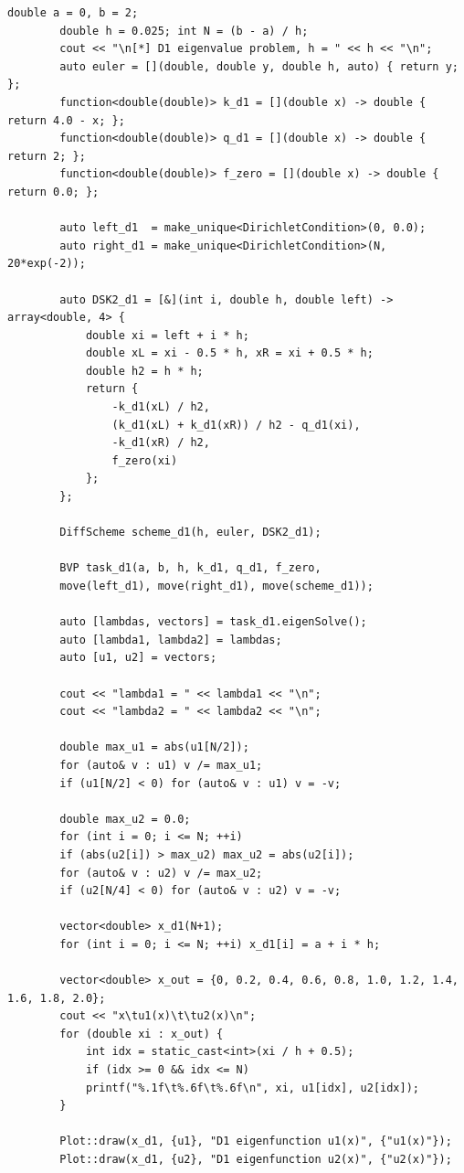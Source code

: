 \documentclass[a4paper,12pt]{article}
\begin{document}
	\begin{lstlisting}[caption={Численное решение исходной задачи}, label={lst:main}]
		double a = 0, b = 2;
		double h = 0.025; int N = (b - a) / h;
		cout << "\n[*] D1 eigenvalue problem, h = " << h << "\n";
		auto euler = [](double, double y, double h, auto) { return y; }; 
		function<double(double)> k_d1 = [](double x) -> double { return 4.0 - x; };
		function<double(double)> q_d1 = [](double x) -> double { return 2; };
		function<double(double)> f_zero = [](double x) -> double { return 0.0; };
		
		auto left_d1  = make_unique<DirichletCondition>(0, 0.0);
		auto right_d1 = make_unique<DirichletCondition>(N, 20*exp(-2));
		
		auto DSK2_d1 = [&](int i, double h, double left) -> array<double, 4> {
			double xi = left + i * h;
			double xL = xi - 0.5 * h, xR = xi + 0.5 * h;
			double h2 = h * h;
			return {
				-k_d1(xL) / h2,
				(k_d1(xL) + k_d1(xR)) / h2 - q_d1(xi),
				-k_d1(xR) / h2,
				f_zero(xi)
			};
		};
		
		DiffScheme scheme_d1(h, euler, DSK2_d1);
		
		BVP task_d1(a, b, h, k_d1, q_d1, f_zero,
		move(left_d1), move(right_d1), move(scheme_d1));
		
		auto [lambdas, vectors] = task_d1.eigenSolve();
		auto [lambda1, lambda2] = lambdas;
		auto [u1, u2] = vectors;
		
		cout << "lambda1 = " << lambda1 << "\n";
		cout << "lambda2 = " << lambda2 << "\n";
		
		double max_u1 = abs(u1[N/2]);
		for (auto& v : u1) v /= max_u1;
		if (u1[N/2] < 0) for (auto& v : u1) v = -v;
		
		double max_u2 = 0.0;
		for (int i = 0; i <= N; ++i)
		if (abs(u2[i]) > max_u2) max_u2 = abs(u2[i]);
		for (auto& v : u2) v /= max_u2;
		if (u2[N/4] < 0) for (auto& v : u2) v = -v;
		
		vector<double> x_d1(N+1);
		for (int i = 0; i <= N; ++i) x_d1[i] = a + i * h;
		
		vector<double> x_out = {0, 0.2, 0.4, 0.6, 0.8, 1.0, 1.2, 1.4, 1.6, 1.8, 2.0};
		cout << "x\tu1(x)\t\tu2(x)\n";
		for (double xi : x_out) {
			int idx = static_cast<int>(xi / h + 0.5);
			if (idx >= 0 && idx <= N)
			printf("%.1f\t%.6f\t%.6f\n", xi, u1[idx], u2[idx]);
		}
		
		Plot::draw(x_d1, {u1}, "D1 eigenfunction u1(x)", {"u1(x)"});
		Plot::draw(x_d1, {u2}, "D1 eigenfunction u2(x)", {"u2(x)"});
	\end{lstlisting}
	
\end{document}
